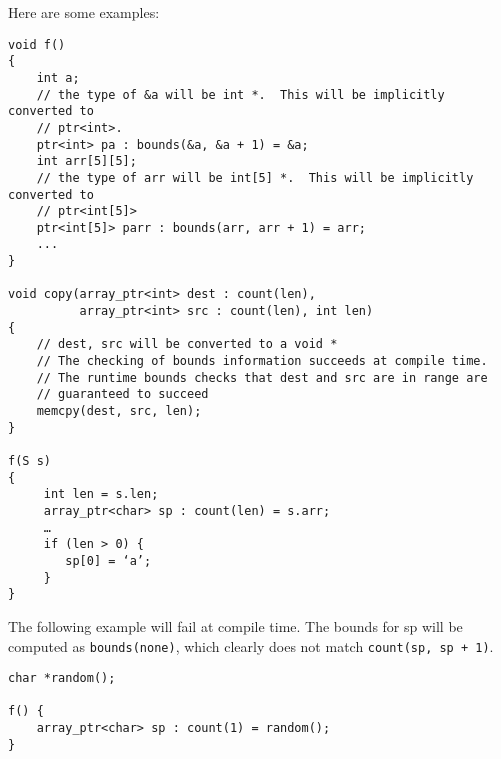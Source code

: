 Here are some examples:
\begin{verbatim}
void f() 
{
    int a;
    // the type of &a will be int *.  This will be implicitly converted to
    // ptr<int>.
    ptr<int> pa : bounds(&a, &a + 1) = &a;
    int arr[5][5];
    // the type of arr will be int[5] *.  This will be implicitly converted to
    // ptr<int[5]> 
    ptr<int[5]> parr : bounds(arr, arr + 1) = arr;
    ...
}

void copy(array_ptr<int> dest : count(len), 
          array_ptr<int> src : count(len), int len)
{
    // dest, src will be converted to a void *
    // The checking of bounds information succeeds at compile time.
    // The runtime bounds checks that dest and src are in range are  
    // guaranteed to succeed
    memcpy(dest, src, len);
}
 
f(S s) 
{
     int len = s.len;
     array_ptr<char> sp : count(len) = s.arr;
     …
     if (len > 0) {
        sp[0] = ‘a’;
     }
}
\end{verbatim}

The following example will fail at compile time. The bounds for sp will
be computed as \texttt{bounds(none)}, which clearly does not match
\texttt{count(sp, sp + 1)}.
\begin{verbatim}
char *random();

f() {
    array_ptr<char> sp : count(1) = random(); 
}
\end{verbatim}
